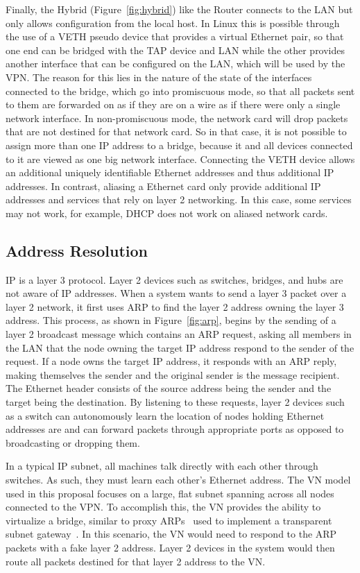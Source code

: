 Finally, the Hybrid (Figure~\ref{fig:hybrid}) like the Router connects to the
LAN but only allows configuration from the local host.  In Linux this is
possible through the use of a VETH pseudo device that provides a virtual
Ethernet pair, so that one end can be bridged with the TAP device and LAN while
the other provides another interface that can be configured on the LAN, which
will be used by the VPN.  The reason for this lies in the nature of the state
of the interfaces connected to the bridge, which go into promiscuous mode, so
that all packets sent to them are forwarded on as if they are on a wire as if
there were only a single network interface.  In non-promiscuous mode, the
network card will drop packets that are not destined for that network card.
So in that case, it is not possible to assign more than one IP address to a
bridge, because it and all devices connected to it are viewed as one big network
interface.  Connecting the VETH device allows an additional uniquely
identifiable Ethernet addresses and thus additional IP addresses.  In contrast,
aliasing a Ethernet card only provide additional IP addresses and services that
rely on layer 2 networking. In this case, some services may not work, for
example, DHCP does not work on aliased network cards.

\subsection{Address Resolution}
IP is a layer 3 protocol. Layer 2 devices such as switches, bridges, and hubs 
are not aware of IP addresses.  When a system wants to send a layer 3 packet
over a layer 2 network, it first uses ARP to find the layer 2 address owning
the layer 3 address.  This process, as shown in Figure~\ref{fig:arp}, begins by
the sending of a layer 2 broadcast message which contains an ARP request,
asking all members in the LAN that the node owning the target IP address
respond to the sender of the request.  If a node owns the target IP address,
it responds with an ARP reply, making themselves the sender and the original
sender is the message recipient.  The Ethernet header consists of the source
address being the sender and the target being the destination.  By listening to
these requests, layer 2 devices such as a switch can autonomously learn the
location of nodes holding Ethernet addresses are and can forward packets
through appropriate ports as opposed to broadcasting or dropping them.

In a typical IP subnet, all machines talk directly with each other through
switches.  As such, they must learn each other's Ethernet address. The VN model
used in this proposal focuses on a large, flat subnet spanning across all nodes
connected to the VPN.  To accomplish this, the VN provides the ability to
virtualize a bridge, similar to proxy ARPs~\cite{RFC0925} used to implement a
transparent subnet gateway~\cite{RFC1027}.  In this scenario, the VN would
need to respond to the ARP packets with a fake layer 2 address.  Layer 2
devices in the system would then route all packets destined for that layer 2
address to the VN.

